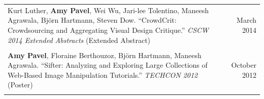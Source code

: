 \begin{longtable}{Xr}
	Kurt Luther, \textbf{Amy Pavel}, Wei Wu, Jari-lee Tolentino, Maneesh Agrawala, Björn Hartmann, Steven Dow. ``CrowdCrit: Crowdsourcing and Aggregating Visual Design Critique.'' \textit{CSCW 2014 Extended Abstracts} (Extended Abstract) & March 2014 \\
	\\

	\textbf{Amy Pavel}, Floraine Berthouzoz, Björn Hartmann, Maneesh Agrawala. ``Sifter: Analyzing and Exploring Large Collections of Web-Based Image Manipulation Tutorials.'' \textit{TECHCON 2012} (Poster) & October 2012 \\
	\\

\end{longtable}